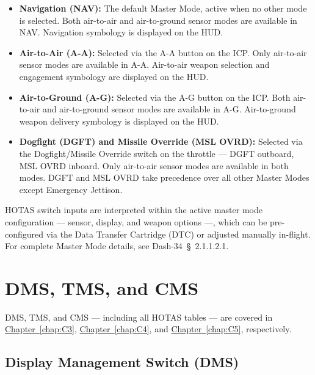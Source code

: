\documentclass[11pt, a4paper, twoside]{report}
\newcommand{\dashref}[1]{Dash-34~\S~#1}
\newcommand{\chapref}[1]{\hyperref[#1]{Chapter~\ref*{#1}}}
\begin{document}
\begin{itemize}

	\item \textbf{Navigation (NAV):} The default Master Mode, active when no other mode is selected. Both air-to-air and air-to-ground sensor modes are available in NAV. Navigation symbology is displayed on the HUD.
    \item \textbf{Air-to-Air (A-A):} Selected via the A-A button on the ICP. Only air-to-air sensor modes are available in A-A. Air-to-air weapon selection and engagement symbology are displayed on the HUD.
    \item \textbf{Air-to-Ground (A-G):} Selected via the A-G button on the ICP. Both air-to-air and air-to-ground sensor modes are available in A-G. Air-to-ground weapon delivery symbology is displayed on the HUD.
    \item \textbf{Dogfight (DGFT) and Missile Override (MSL OVRD):} Selected via the Dogfight/Missile Override switch on the throttle — DGFT outboard, MSL OVRD inboard. Only air-to-air sensor modes are available in both modes. DGFT and MSL OVRD take precedence over all other Master Modes except Emergency Jettison.

\end{itemize}

HOTAS switch inputs are interpreted within the active master mode configuration --- sensor, display, and weapon options ---, which can be pre-configured via the Data Transfer Cartridge (DTC) or adjusted manually in-flight. For complete Master Mode details, see \dashref{2.1.1.2.1}.

\section{DMS, TMS, and CMS}
\label{sec:C2-S3}

DMS, TMS, and CMS — including all HOTAS tables — are covered in \chapref{chap:C3}, \chapref{chap:C4}, and \chapref{chap:C5}, respectively.

\subsection{Display Management Switch (DMS)}
\label{sec:C2-S3-S1}
\end{document}
